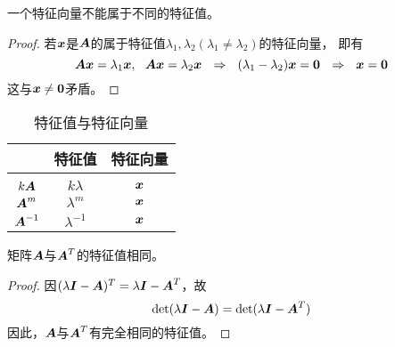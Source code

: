 \begin{frame}
  
  \begin{dingli}
    一个特征向量不能属于不同的特征值。
  \end{dingli}
  \pause 

  \begin{proof}
  若$\vx$是$\MA$的属于特征值$\lambda_1,\lambda_2(\lambda_1\ne\lambda_2)$的特征向量，
  即有
  $$
  \MA\vx=\lambda_1\vx, ~~ \MA\vx=\lambda_2\vx
  ~~\Rightarrow~~ (\lambda_1-\lambda_2)\vx=\M0
  ~~\Rightarrow~~ \vx=\M0
  $$
  这与$\vx\ne\M0$矛盾。
\end{proof}
\end{frame}

\begin{frame}
  
  \begin{xingzhi}
    \begin{table}
      \caption{特征值与特征向量}
      
      \begin{tabular}{|c|c|c|}\hline
        &特征值&特征向量\\\hline
        \red{$\MA$}&\red{$\lambda$}&\red{$\vx$}\\ \hline 
        \hline  
        $k\boldsymbol{A}$&$k\lambda$&$\vx$\\\hline
        $\boldsymbol{A}^m$&$\lambda^m$&$\vx$\\\hline
        $\boldsymbol{A}^{-1}$&$\lambda^{-1}$&$\vx$\\\hline
      \end{tabular}
    \end{table}
  \end{xingzhi}
  
\end{frame}

\begin{frame}
  
  \begin{xingzhi}
    矩阵$\MA$与$\boldsymbol{A}^T$的特征值相同。
  \end{xingzhi} \vspace{.1in}\pause 

  \begin{proof}
    因$(\lambda\boldsymbol{I}-\boldsymbol{A})^T=\lambda\boldsymbol{I}-\boldsymbol{A}^T$，故
    $$
    \mathrm{det}(\lambda\boldsymbol{I}-\boldsymbol{A})=\mathrm{det}(\lambda\boldsymbol{I}-\boldsymbol{A}^T)
    $$
    因此，$\MA$与$\boldsymbol{A}^T$有完全相同的特征值。
  \end{proof}
  
\end{frame}

